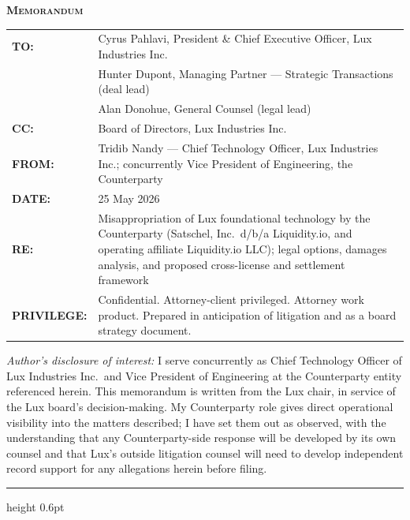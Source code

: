 \documentclass[11pt,letterpaper]{article}
\begin{document}
\begin{flushleft}
\textbf{\textsc{Memorandum}}\\[0.5em]
\begin{tabularx}{\textwidth}{lX}
\textbf{TO:}        & Cyrus Pahlavi, President \& Chief Executive Officer, Lux Industries Inc. \\
                    & Hunter Dupont, Managing Partner --- Strategic Transactions (deal lead) \\
                    & Alan Donohue, General Counsel (legal lead) \\
\textbf{CC:}        & Board of Directors, Lux Industries Inc. \\
\textbf{FROM:}      & Tridib Nandy --- Chief Technology Officer, Lux Industries Inc.; concurrently Vice President of Engineering, the Counterparty \\
\textbf{DATE:}      & 25 May 2026 \\
\textbf{RE:}        & Misappropriation of Lux foundational technology by the Counterparty (Satschel, Inc.\ d/b/a Liquidity.io, and operating affiliate Liquidity.io LLC); legal options, damages analysis, and proposed cross-license and settlement framework \\
\textbf{PRIVILEGE:} & Confidential. Attorney-client privileged. Attorney work product. Prepared in anticipation of litigation and as a board strategy document. \\
\end{tabularx}
\end{flushleft}

\vspace{0.3em}
\begin{small}
\textit{Author's disclosure of interest:} I serve concurrently as
Chief Technology Officer of Lux Industries Inc.\ and Vice President
of Engineering at the Counterparty entity referenced herein. This
memorandum is written from the Lux chair, in service of the Lux
board's decision-making. My Counterparty role gives direct
operational visibility into the matters described; I have set them
out as observed, with the understanding that any Counterparty-side
response will be developed by its own counsel and that Lux's outside
litigation counsel will need to develop independent record support
for any allegations herein before filing.
\end{small}

\vspace{0.5em}\hrule height 0.6pt\vspace{1em}
\end{document}

